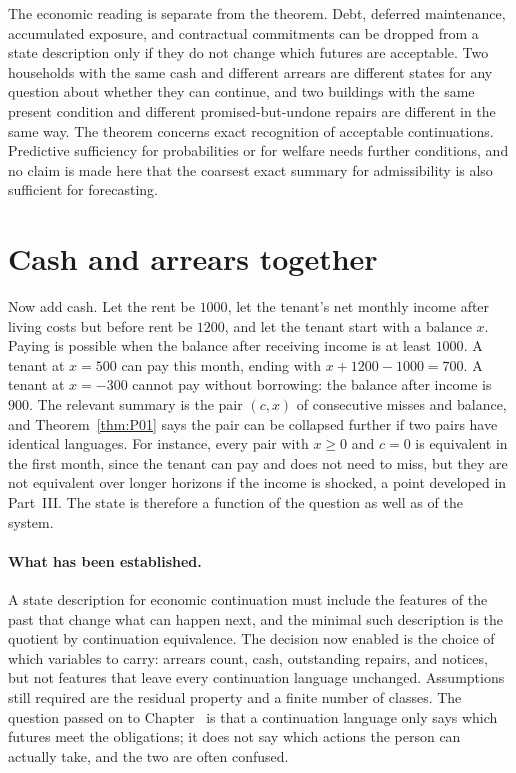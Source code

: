 The economic reading is separate from the theorem. Debt, deferred maintenance, accumulated exposure, and contractual commitments can be dropped from a state description only if they do not change which futures are acceptable. Two households with the same cash and different arrears are different states for any question about whether they can continue, and two buildings with the same present condition and different promised-but-undone repairs are different in the same way. The theorem concerns exact recognition of acceptable continuations. Predictive sufficiency for probabilities or for welfare needs further conditions, and no claim is made here that the coarsest exact summary for admissibility is also sufficient for forecasting.

\section{Cash and arrears together}

Now add cash. Let the rent be $1000$, let the tenant's net monthly income after living costs but before rent be $1200$, and let the tenant start with a balance $x$. Paying is possible when the balance after receiving income is at least $1000$. A tenant at $x=500$ can pay this month, ending with $x+1200-1000=700$. A tenant at $x=-300$ cannot pay without borrowing: the balance after income is $900$. The relevant summary is the pair $(c,x)$ of consecutive misses and balance, and Theorem~\ref{thm:P01} says the pair can be collapsed further if two pairs have identical languages. For instance, every pair with $x\ge 0$ and $c=0$ is equivalent in the first month, since the tenant can pay and does not need to miss, but they are not equivalent over longer horizons if the income is shocked, a point developed in Part~III. The state is therefore a function of the question as well as of the system.

\paragraph{What has been established.} A state description for economic continuation must include the features of the past that change what can happen next, and the minimal such description is the quotient by continuation equivalence. The decision now enabled is the choice of which variables to carry: arrears count, cash, outstanding repairs, and notices, but not features that leave every continuation language unchanged. Assumptions still required are the residual property and a finite number of classes. The question passed on to Chapter~ is that a continuation language only says which futures meet the obligations; it does not say which actions the person can actually take, and the two are often confused.

